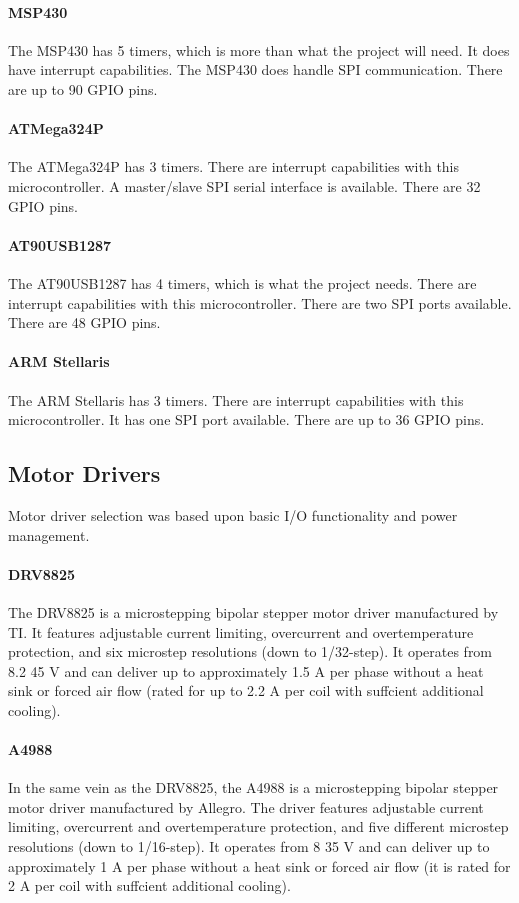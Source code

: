 \paragraph{MSP430} The MSP430 has 5 timers, which is more than what the project will need.
It does have interrupt capabilities.
The MSP430 does handle SPI communication. 
There are up to 90 GPIO pins.

\paragraph{ATMega324P} The ATMega324P has 3 timers.
There are interrupt capabilities with this microcontroller.
A master/slave SPI serial interface is available.
There are 32 GPIO pins.   

\paragraph{AT90USB1287} The AT90USB1287 has 4 timers, which is what the project needs.
There are interrupt capabilities with this microcontroller.
There are two SPI ports available. 
There are 48 GPIO pins.

\paragraph{ARM Stellaris} The ARM Stellaris has 3 timers.
There are interrupt capabilities with this microcontroller.
It has one SPI port available.
There are up to 36 GPIO pins.

\subsection{Motor Drivers}
Motor driver selection was based upon basic I/O functionality and power management.

\paragraph{DRV8825}
The DRV8825 is a microstepping bipolar stepper motor driver manufactured by TI.
It features adjustable current limiting, overcurrent and overtemperature protection, and six microstep resolutions (down to 1/32-step).
It operates from 8.2 45 V and can deliver up to approximately 1.5 A per phase without a heat sink or forced air ﬂow (rated for up to 2.2 A per coil with suffcient additional cooling).

\paragraph{A4988}
In the same vein as the DRV8825, the A4988 is a microstepping bipolar stepper motor driver manufactured by Allegro.
The driver features adjustable current limiting, overcurrent and overtemperature protection, and five different microstep resolutions (down to 1/16-step).
It operates from 8 35 V and can deliver up to approximately 1 A per phase without a heat sink or forced air ﬂow (it is rated for 2 A per coil with suffcient additional cooling).

